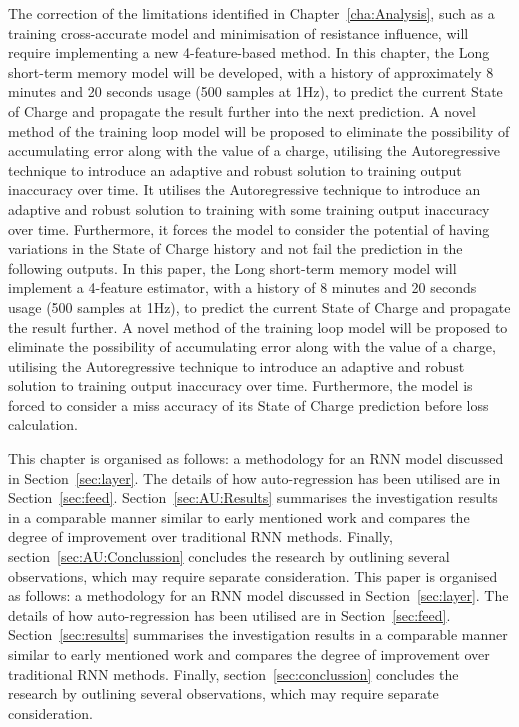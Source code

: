 %
{
    The correction of the limitations identified in Chapter~\ref{cha:Analysis}, such as a training cross-accurate model and minimisation of resistance influence, will require implementing a new 4-feature-based method.
    In this chapter, the Long short-term memory model will be developed, with a history of approximately 8 minutes and 20 seconds usage (500 samples at 1Hz), to predict the current State of Charge and propagate the result further into the next prediction.
    A novel method of the training loop model will be proposed to eliminate the possibility of accumulating error along with the value of a charge, utilising the Autoregressive technique to introduce an adaptive and robust solution to training output inaccuracy over time.
    It utilises the Autoregressive technique to introduce an adaptive and robust solution to training with some training output inaccuracy over time.
    Furthermore, it forces the model to consider the potential of having variations in the State of Charge history and not fail the prediction in the following outputs.
} {
    In this paper, the Long short-term memory model will implement a 4-feature estimator, with a history of 8 minutes and 20 seconds usage (500 samples at 1Hz), to predict the current State of Charge and propagate the result further.
    A novel method of the training loop model will be proposed to eliminate the possibility of accumulating error along with the value of a charge, utilising the Autoregressive technique to introduce an adaptive and robust solution to training output inaccuracy over time.
    Furthermore, the model is forced to consider a miss accuracy of its State of Charge prediction before loss calculation.
}

%
%
{
    This chapter is organised as follows: a methodology for an RNN model discussed in Section~\ref{sec:layer}.
    The details of how auto-regression has been utilised are in Section~\ref{sec:feed}.
    Section~\ref{sec:AU:Results} summarises the investigation results in a comparable manner similar to early mentioned work and compares the degree of improvement over traditional RNN methods.
    Finally, section~\ref{sec:AU:Conclussion} concludes the research by outlining several observations, which may require separate consideration.
} {
    This paper is organised as follows: a methodology for an RNN model discussed in Section~\ref{sec:layer}.
    The details of how auto-regression has been utilised are in Section~\ref{sec:feed}.
    Section~\ref{sec:results} summarises the investigation results in a comparable manner similar to early mentioned work and compares the degree of improvement over traditional RNN methods.
    Finally, section~\ref{sec:conclussion} concludes the research by outlining several observations, which may require separate consideration.
}
